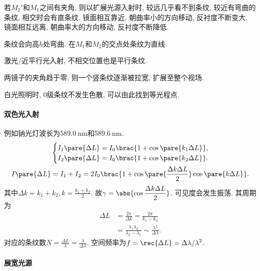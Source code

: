 \documentclass{ctexart}
\begin{document}
若$M_2'$和$M_1$之间有夹角, 则以扩展光源入射时, 较远几乎看不到条纹, 较近有弯曲的条纹, 相交时会有直条纹. 镜面相互靠近, 朝曲率小的方向移动, 反衬度不断变大. 镜面相互远离, 朝曲率大的方向移动, 反衬度不断降低.
\par
条纹会向高$h$处弯曲. 在$M_1$和$M_2$的交点处条纹为直线.
\par
\begin{remark}
    激光/近平行光入射, 不相交位置也是平行条纹.
\end{remark}
\begin{remark}
    两镜子的夹角趋于零, 则一个竖条纹逐渐被拉宽, 扩展至整个视场.
\end{remark}
\par
白光照明时, $0$级条纹不发生色散, 可以由此找到等光程点.

\paragraph{双色光入射} %
\label{par:双色光入射}

例如钠光灯波长为$\SI{589.0}{\nano\meter}$和$\SI{589.6}{\nano\meter}$.
\begin{align*}
    &\begin{cases}
        I_1 \pare{\Delta L} = I_0\brac{1+\cos\pare{k_1\Delta L}}, \\
        I_2 \pare{\Delta L} = I_0\brac{1+\cos\pare{k_2\Delta L}}.
    \end{cases}\\
    I\pare{\Delta L} &= I_1 + I_2 = 2I_0 \brac{1 + \cos\pare{\frac{\Delta k\Delta L}{2}}\cos\pare{k\Delta L}}.
\end{align*}
其中$\Delta k = k_1 + k_2,\displaystyle k = \frac{k_1+k_2}{2}$. 故$\displaystyle \gamma = \abs{\cos \frac{\Delta k \Delta L}{2}}$. 可见度会发生振荡, 其周期为
\begin{align*}
    \Delta L &= \frac{2\pi}{\Delta k} = \frac{2\pi}{k_1 - k_2} \\
    &= \frac{\lambda_1 \lambda_2}{\lambda_2 - \lambda_1} \sim \frac{\lambda^2}{\Delta\lambda}.
\end{align*}
对应的条纹数$\displaystyle N = \frac{\Delta L}{\lambda} = \frac{\lambda}{\Delta\lambda}$. 空间频率为$\displaystyle f = \rec{\Delta L} = \Delta \lambda / \lambda^2$.


\paragraph{展宽光源} %
\label{par:展宽光源}
\end{document}
